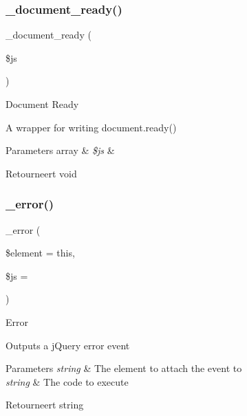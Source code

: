 \subsubsection{\texorpdfstring{\_document\_ready()}{\_document\_ready()}}
{\footnotesize\ttfamily \+\_\+document\+\_\+ready (\begin{DoxyParamCaption}\item[{}]{\$js }\end{DoxyParamCaption})\hspace{0.3cm}{\ttfamily [protected]}}

Document Ready

A wrapper for writing document.\+ready()


\begin{DoxyParams}[1]{Parameters}
array & {\em \$js} & \\
\hline
\end{DoxyParams}
\begin{DoxyReturn}{Retourneert}
void 
\end{DoxyReturn}
\mbox{\label{class_c_i___jquery_a8731ec925abaf39ed5e8635365c6512d}} 
\subsubsection{\texorpdfstring{\_error()}{\_error()}}
{\footnotesize\ttfamily \+\_\+error (\begin{DoxyParamCaption}\item[{}]{\$element = {\ttfamily \textquotesingle{}this\textquotesingle{}},  }\item[{}]{\$js = {\ttfamily \textquotesingle{}\textquotesingle{}} }\end{DoxyParamCaption})\hspace{0.3cm}{\ttfamily [protected]}}

Error

Outputs a j\+Query error event


\begin{DoxyParams}{Parameters}
{\em string} & The element to attach the event to \\
\hline
{\em string} & The code to execute \\
\hline
\end{DoxyParams}
\begin{DoxyReturn}{Retourneert}
string 
\end{DoxyReturn}
\mbox{\label{class_c_i___jquery_a2d323b3e6a8e62d1a940cbf58e216992}} 
